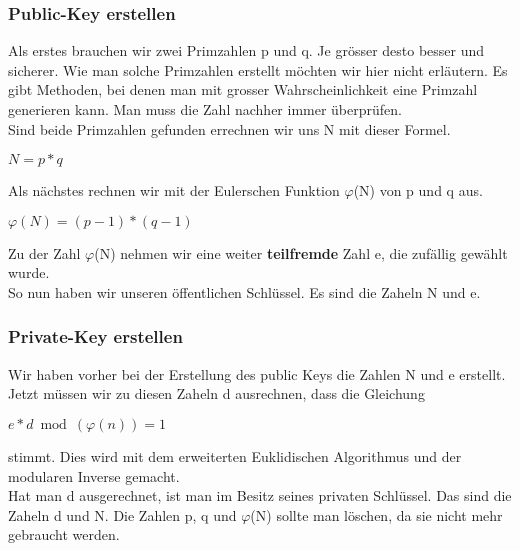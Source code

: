 \subsubsection{Public-Key erstellen}
Als erstes brauchen wir zwei Primzahlen p und q. Je grösser desto besser und sicherer. Wie man solche Primzahlen erstellt möchten wir hier nicht erläutern. Es gibt Methoden, bei denen man mit grosser Wahrscheinlichkeit eine Primzahl generieren kann. Man muss die Zahl nachher immer überprüfen.\\
Sind beide Primzahlen gefunden errechnen wir uns N mit dieser Formel.
\begin{center}
$ N = p * q $
\end{center}
Als nächstes rechnen wir mit der Eulerschen Funktion $\varphi$(N) von p und q aus. 
\begin{center}
$ \varphi(N) = (p - 1) * (q - 1) $
\end{center}
Zu der Zahl $\varphi$(N) nehmen wir eine weiter \textbf{teilfremde} Zahl e, die zufällig gewählt wurde.\\
So nun haben wir unseren öffentlichen Schlüssel. Es sind die Zaheln N und e.
\subsubsection{Private-Key erstellen}
Wir haben vorher bei der Erstellung des public Keys die Zahlen N und e erstellt. Jetzt müssen wir zu diesen Zaheln d ausrechnen, dass die Gleichung
\begin{center}
$ e * d \bmod(\varphi(n)) = 1 $
\end{center}
stimmt. Dies wird mit dem erweiterten Euklidischen Algorithmus und der modularen Inverse gemacht.\\ 
Hat man d ausgerechnet, ist man im Besitz seines privaten Schlüssel. Das sind die Zaheln d und N. Die Zahlen p, q und $\varphi$(N) sollte man löschen, da sie nicht mehr gebraucht werden.
